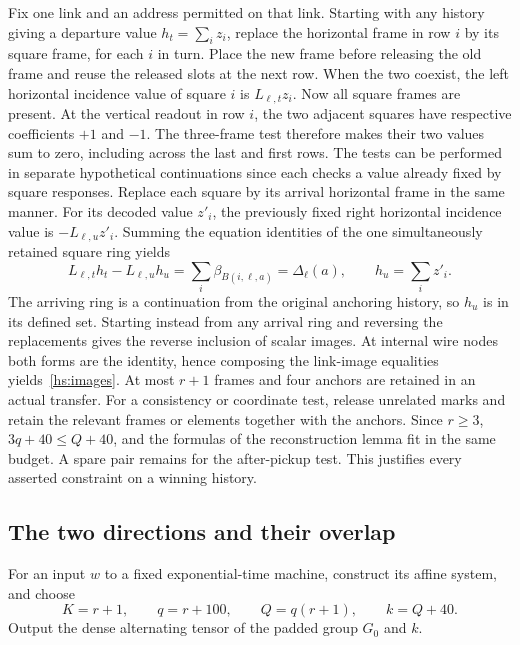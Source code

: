 \documentclass[11pt]{article}
\theoremstyle{definition}
\theoremstyle{remark}
\numberwithin{equation}{section}
\begin{document}
Fix one link and an address permitted on that link. Starting with any
history giving a departure value \(h_t=\sum_i z_i\), replace the
horizontal frame in row \(i\) by its square frame, for each \(i\) in
turn. Place the new frame before releasing the old frame and reuse the
released slots at the next row. When the two coexist, the left horizontal
incidence value of square \(i\) is \(L_{\ell,t}z_i\).
Now all square frames are present. At the vertical readout in row \(i\),
the two adjacent squares have respective coefficients \(+1\) and
\(-1\). The three-frame test therefore makes their two values sum to
zero, including across the last and first rows. The tests can be
performed in separate hypothetical continuations since each checks a
value already fixed by square responses. Replace each square by its
arrival horizontal frame in the same manner. For its decoded value
\(z'_i\), the previously fixed right horizontal incidence value is
\(-L_{\ell,u}z'_i\). Summing the equation identities of the one
simultaneously retained square ring yields
\[
 L_{\ell,t}h_t-L_{\ell,u}h_u=\sum_i\beta_{B(i,\ell,a)}
   =\Delta_\ell(a),\qquad h_u=\sum_i z'_i.
\]
The arriving ring is a continuation from the original anchoring
history, so \(h_u\) is in its defined set. Starting instead from any
arrival ring and reversing the replacements gives the reverse inclusion
of scalar images. At internal wire nodes both forms are the identity,
hence composing the link-image equalities yields~\eqref{hs:images}.
At most $r+1$ frames and four anchors are retained in an actual
transfer. For a consistency or coordinate test, release unrelated
marks and retain the relevant frames or elements together with the
anchors. Since $r\ge3$, $3q+40\le Q+40$, and the formulas of the
reconstruction lemma fit in the same budget. A spare pair remains for
the after-pickup test. This justifies every asserted constraint on a
winning history.

\subsection{The two directions and their overlap}

For an input $w$ to a fixed exponential-time machine, construct its
affine system, and choose
\begin{equation}
 K=r+1,\qquad q=r+100,\qquad Q=q(r+1),\qquad k=Q+40.
 \label{eq:parameters}
\end{equation}
Output the dense alternating tensor of the padded group $G_0$ and $k$.
\end{document}
